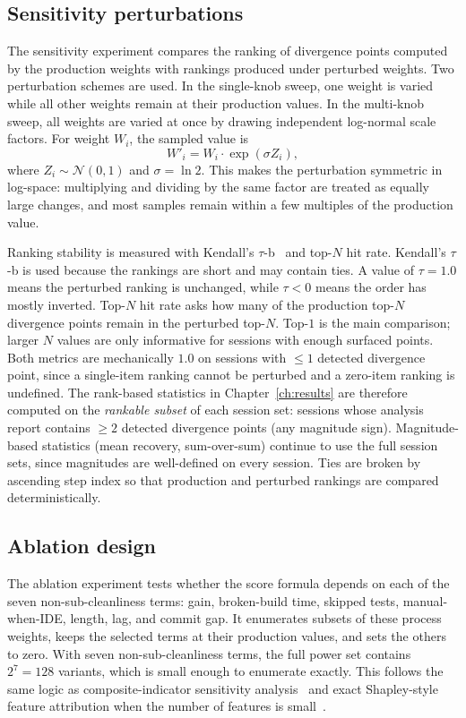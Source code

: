 \subsection{Sensitivity perturbations}
\label{sec:methodology-sensitivity-design}

The sensitivity experiment compares the ranking of divergence points computed by the production weights with rankings produced under perturbed weights. Two perturbation schemes are used. In the single-knob sweep, one weight is varied while all other weights remain at their production values. In the multi-knob sweep, all weights are varied at once by drawing independent log-normal scale factors. For weight $W_i$, the sampled value is
\[
W'_i = W_i \cdot \exp(\sigma Z_i),
\]
where $Z_i \sim \mathcal{N}(0, 1)$ and $\sigma = \ln 2$. This makes the perturbation symmetric in log-space: multiplying and dividing by the same factor are treated as equally large changes, and most samples remain within a few multiples of the production value.

Ranking stability is measured with Kendall's $\tau$-b~\cite{kendall1948rank,agresti2010ordinal} and top-$N$ hit rate. Kendall's $\tau$-b is used because the rankings are short and may contain ties. A value of $\tau = 1.0$ means the perturbed ranking is unchanged, while $\tau < 0$ means the order has mostly inverted. Top-$N$ hit rate asks how many of the production top-$N$ divergence points remain in the perturbed top-$N$. Top-$1$ is the main comparison; larger $N$ values are only informative for sessions with enough surfaced points. Both metrics are mechanically $1.0$ on sessions with $\leq 1$ detected divergence point, since a single-item ranking cannot be perturbed and a zero-item ranking is undefined. The rank-based statistics in Chapter~\ref{ch:results} are therefore computed on the \emph{rankable subset} of each session set: sessions whose analysis report contains $\geq 2$ detected divergence points (any magnitude sign). Magnitude-based statistics (mean recovery, sum-over-sum) continue to use the full session sets, since magnitudes are well-defined on every session. Ties are broken by ascending step index so that production and perturbed rankings are compared deterministically.

\subsection{Ablation design}
\label{sec:methodology-ablation-design}

The ablation experiment tests whether the score formula depends on each of the seven non-sub-cleanliness terms: gain, broken-build time, skipped tests, manual-when-IDE, length, lag, and commit gap. It enumerates subsets of these process weights, keeps the selected terms at their production values, and sets the others to zero. With seven non-sub-cleanliness terms, the full power set contains $2^7 = 128$ variants, which is small enough to enumerate exactly. This follows the same logic as composite-indicator sensitivity analysis~\cite{saisana2005composite} and exact Shapley-style feature attribution when the number of features is small~\cite{lundberg2017shap,strumbelj2014explaining}.

